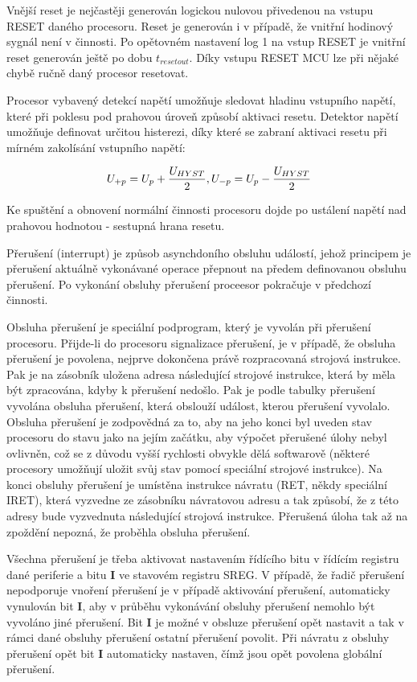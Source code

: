 Vnější reset je nejčastěji generován logickou nulovou přivedenou na vstupu RESET daného procesoru. Reset je generován i v případě, že vnitřní hodinový sygnál není v činnosti. Po opětovném nastavení log 1 na vstup RESET je vnitřní reset generován ještě po dobu $t_{reset out}$. Díky vstupu RESET MCU lze při nějaké chybě ručně daný procesor resetovat.


Procesor vybavený detekcí napětí umožňuje sledovat hladinu vstupního napětí, které při poklesu pod prahovou úroveň způsobí aktivaci resetu. Detektor napětí umožňuje definovat určitou histerezi, díky které se zabraní aktivaci resetu při mírném zakolísání vstupního napětí:

$$ U_{+p} = U_p + {U_{HYST}\over2}, U_{-p} = U_p - {U_{HYST}\over2} $$

Ke spuštění a obnovení normální činnosti procesoru dojde po ustálení napětí nad prahovou hodnotou - sestupná hrana resetu. 


Přerušení (interrupt) je způsob asynchdoního obsluhu událostí, jehož principem je přerušení aktuálně vykonávané operace přepnout na předem definovanou obsluhu přerušení. Po vykonání obsluhy přerušení proceesor pokračuje v předchozí činnosti. 


Obsluha přerušení je speciální podprogram, který je vyvolán při přerušení procesoru. Přijde-li do procesoru signalizace přerušení, je v případě, že obsluha přerušení je povolena, nejprve dokončena právě rozpracovaná strojová instrukce. Pak je na zásobník uložena adresa následující strojové instrukce, která by měla být zpracována, kdyby k přerušení nedošlo. Pak je podle tabulky přerušení vyvolána obsluha přerušení, která obslouží událost, kterou přerušení vyvolalo. Obsluha přerušení je zodpovědná za to, aby na jeho konci byl uveden stav procesoru do stavu jako na jejím začátku, aby výpočet přerušené úlohy nebyl ovlivněn, což se z důvodu vyšší rychlosti obvykle dělá softwarově (některé procesory umožňují uložit svůj stav pomocí speciální strojové instrukce). Na konci obsluhy přerušení je umístěna instrukce návratu (RET, někdy speciální IRET), která vyzvedne ze zásobníku návratovou adresu a tak způsobí, že z této adresy bude vyzvednuta následující strojová instrukce. Přerušená úloha tak až na zpoždění nepozná, že proběhla obsluha přerušení.

Všechna přerušení je třeba aktivovat nastavením řídícího bitu v řídícím registru dané periferie a bitu {\bf I} ve stavovém registru SREG. V případě, že řadič přerušení nepodporuje vnoření přerušení je v případě aktivování přerušení, automaticky vynulován bit {\bf I}, aby v průběhu vykonávání obsluhy přerušení nemohlo být vyvoláno jiné přerušení. Bit {\bf I} je možné v obsluze přerušení opět nastavit a tak v rámci dané obsluhy přerušení ostatní přerušení povolit. Při návratu z obsluhy přerušení opět bit {\bf I} automaticky nastaven, čímž jsou opět povolena globální přerušení. 

